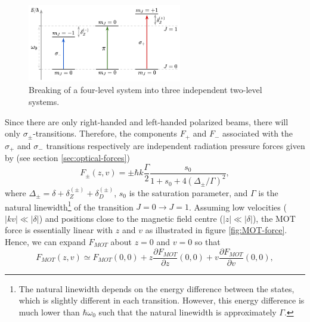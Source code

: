 \begin{figure}[!ht]
	\centering
	\includegraphics[width=0.6\textwidth]{USPSC-img/Independent-two-level-system.png}
	\caption{Breaking of a four-level system into three independent two-level systems.}
	\label{fig:independent-two-level-system}
\end{figure}

Since there are only right-handed and left-handed polarized beams, there will only $ \sigma_{\pm} $-transitions. Therefore, the components $ F_{+} $ and $ F_{-} $ associated with the $ \sigma_{+} $ and $ \sigma_{-} $ transitions respectively are independent radiation pressure forces given by (see section \ref{sec:optical-forces})
\begin{equation}
	F_{\pm}(z, v) = \pm \hbar k \frac{\Gamma}{2} \frac{s_0}{1 + s_0 + 4(\Delta_{\pm} / \Gamma)^2},
	\label{eq:1D-MOT-force-components}
\end{equation}
where $ \Delta_{\pm} = \delta + \delta_{Z}^{(\pm)} + \delta_{D}^{(\pm)} $, $ s_0 $ is the saturation parameter, and $ \Gamma $ is the natural linewidth\footnote{The natural linewidth depends on the energy difference between the states, which is slightly different in each transition. However, this energy difference is much lower than $ \hbar \omega_0 $ such that the natural linewidth is approximately $ \Gamma $.} of the transition $ J = 0 \rightarrow J = 1 $. Assuming low velocities ($ |kv| \ll |\delta| $) and positions close to the magnetic field centre ($ |z| \ll |\delta| $), the MOT force is essentially linear with $ z $ and $ v $ as illustrated in figure \ref{fig:MOT-force}. Hence, we can expand $ F_{MOT} $ about $ z = 0 $ and $ v = 0 $ so that
\begin{equation}
	F_{MOT}(z, v) \simeq F_{MOT}(0, 0) + z \frac{\partial F_{MOT}}{\partial z}(0, 0) + v \frac{\partial F_{MOT}}{\partial v}(0, 0),
	\label{eq:MOT-force-Taylor-expansion}
\end{equation}

